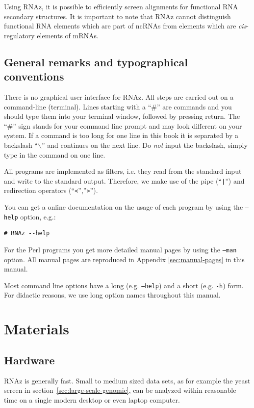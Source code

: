 \documentclass[11pt]{article}
\begin{document}
Using RNAz, it is possible to efficiently screen alignments for functional
RNA secondary structures. It is important to note that RNAz cannot
distinguish functional RNA elements which are part of ncRNAs from elements
which are \emph{cis}-regulatory elements of mRNAs.

\subsection{General remarks and typographical conventions}

There is no graphical user interface for RNAz. All steps are carried out on
a command-line (terminal). Lines starting with a ``\#'' are commands and
you should type them into your terminal window, followed by pressing
return. The ``\#'' sign stands for your command line prompt and may look
different on your system. If a command is too long for one line in this
book it is separated by a backslash ``\texttt{$\backslash$}'' and continues
on the next line. Do \emph{not} input the backslash, simply type in the
command on one line.

All programs are implemented as filters, i.e. they read from the standard
input and write to the standard output. Therefore, we make use of the pipe
(``\texttt{|}'') and redirection operators (``\texttt{<}'',''\texttt{>}'').

You can get a online documentation on the usage of each program by using
the \texttt{--help} option, e.g.:

\begin{verbatim}
# RNAz --help
\end{verbatim}

For the Perl programs you get more detailed manual pages by using the
\texttt{--man} option. All manual pages are reproduced in Appendix
\ref{sec:manual-pages} in this manual.

Most command line options have a long (e.g. \texttt{--help}) and a short
(e.g. \texttt{-h}) form. For didactic reasons, we use long option names
throughout this manual.

\section{Materials}

\subsection{Hardware}

RNAz is generally fast. Small to medium sized data sets, as for example the
yeast screen in section~\ref{sec:large-scale-genomic}, can be analyzed
within reasonable time on a single modern desktop or even laptop computer.
\end{document}
